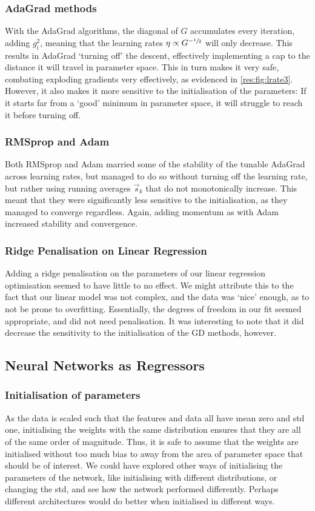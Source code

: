     \subsubsection{AdaGrad methods}
        With the AdaGrad algorithms, the diagonal of $G$ accumulates every iteration, adding $g_i^2$, meaning that the learning rates $\eta \propto G^{-\sfrac{1}{2}}$ will only decrease. This results in AdaGrad `turning off' the descent, effectively implementing a cap to the distance it will travel in parameter space. This in turn makes it very safe, combating exploding gradients very effectively, as evidenced in \cref{res:fig:lrate3}. However, it also makes it more sensitive to the initialisation of the parameters: If it starts far from a `good' minimum in parameter space, it will struggle to reach it before turning off.

    \subsubsection{RMSprop and Adam}
        Both RMSprop and Adam married some of the stability of the tunable AdaGrad across learning rates, but managed to do so without turning off the learning rate, but rather using running averages $\vec{s}_k$ that do not monotonically increase. This meant that they were significantly less sensitive to the initialisation, as they managed to converge regardless. Again, adding momentum as with Adam increased stability and convergence. 

        
        \subsubsection{Ridge Penalisation on Linear Regression}
        Adding a ridge penalisation on the parameters of our linear regression optimisation seemed to have little to no effect. We might attribute this to the fact that our linear model was not complex, and the data was `nice' enough, as to not be prone to overfitting. Essentially, the degrees of freedom in our fit seemed appropriate, and did not need penalisation. It was interesting to note that it did decrease the sensitivity to the initialisation of the GD methods, however.


\subsection{Neural Networks as Regressors}
    \subsubsection{Initialisation of parameters}
        As the data is scaled such that the features and data all have mean zero and std one, initialising the weights with the same distribution ensures that they are all of the same order of magnitude. Thus, it is safe to assume that the weights are initialised without too much bias to away from the area of parameter space that should be of interest. We could have explored other ways of initialising the parameters of the network, like initialising with different distributions, or changing the std, and see how the network performed differently. Perhaps different architectures would do better when initialised in different ways. 


